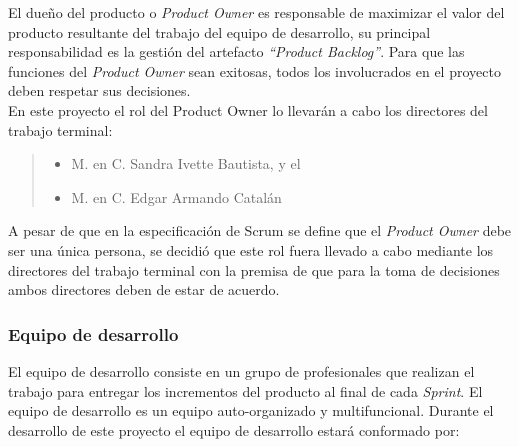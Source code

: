  El dueño del producto o {\em Product Owner} es responsable de maximizar el valor del producto
 resultante del trabajo del equipo de desarrollo, su principal responsabilidad es la gestión
 del artefacto {\em``Product Backlog''}. Para que las funciones del {\it Product Owner} sean exitosas,
 todos los involucrados en el proyecto deben respetar sus decisiones.\\

 \noindent En este proyecto el rol del Product Owner lo llevarán a cabo los directores del trabajo terminal:
     
    \begin{quote}
    \begin{itemize}
        \item M. en C. Sandra Ivette Bautista, y el
        \item M. en C. Edgar Armando Catalán
    \end{itemize}
    \end{quote}
                                         
 \noindent A pesar de que en la especificación de Scrum se define que el {\it Product Owner} debe ser una
 única persona, se decidió que este rol fuera llevado a cabo mediante los directores del trabajo terminal
 con la premisa de que para la toma de decisiones ambos directores deben de estar de acuerdo.

\subsubsection{Equipo de desarrollo}

 El equipo de desarrollo consiste en un grupo de profesionales que realizan el trabajo para entregar
 los incrementos del producto al final de cada {\it Sprint}. El equipo de desarrollo es un equipo
 auto-organizado y multifuncional. Durante el desarrollo de este proyecto el equipo de desarrollo
 estará conformado por:


